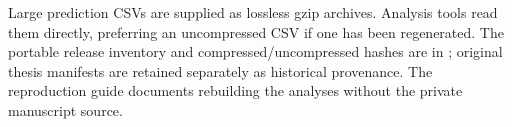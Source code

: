 \documentclass[a4paper,10pt,onecolumn]{IEEEtran}
\begin{document}
Large prediction CSVs are supplied as lossless gzip archives. Analysis tools
read them directly, preferring an uncompressed CSV if one has been regenerated.
The portable release inventory and compressed/uncompressed hashes are in
; original thesis manifests
are retained separately as historical provenance. The reproduction guide
documents rebuilding the analyses without the private manuscript source.



\end{document}
